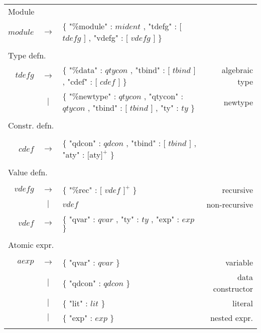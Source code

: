 \begin{scriptsize}
\begin{longtable}{ r c l r }

\\[0.01in]
\multicolumn{4}{l}{Module}		\\
$module$	& $ \rightarrow $ 	& $\{$ "\%module" : $mident$ , "tdefg" : $[$ $tdefg$ $]$ , "vdefg" : $[$ $vdefg$ $]$ $\}$			&			\\
\\[0.01in]

\multicolumn{4}{l}{Type defn.}		\\
$tdefg$ 	& $ \rightarrow $	& $\{$ "\%data" : $qtycon$ , "tbind" : $[$ $tbind$ $]$, "cdef" : $[$ $cdef$ $]$ $\}$							& algebraic type	\\
		& $ | $			& $\{$ "\%newtype" : $qtycon$ , "qtycon" : $qtycon$ , "tbind" : $[$ $tbind$ $]$ , "ty" : $ty$ $\}$ 		& newtype		\\
\\[0.01in]

\multicolumn{4}{l}{Constr. defn.}	\\
\\[0.01in]
$cdef$		& $ \rightarrow $	& $\{$ "qdcon" : $qdcon$ , "tbind" : $[$ $tbind$ $ ]$ , "aty" : $[$aty$]^{+}$ $\}$ 				& 			\\
\\[0.01in]

\multicolumn{4}{l}{Value defn.}		\\
\\[0.01in]
$vdefg$		& $ \rightarrow $	& $\{$ "\%rec" : $[$ $vdef$ $]^{+}$ $\}$    									& recursive		\\
		& $ | $			& $vdef$													& non-recursive		\\
$vdef$ 		& $ \rightarrow $	& $\{$ "qvar" : $qvar$ , "ty" : $ty$ , "exp" : $exp$ $\}$ 							& 			\\
\\[0.01in]

\multicolumn{4}{l}{Atomic expr.}	\\
\\[0.01in]
$aexp$		& $ \rightarrow $	& $\{$ "qvar" : $qvar$ $\}$											& variable		\\
		& $ | $			& $\{$ "qdcon" : $qdcon$ $\}$											& data constructor	\\
		& $ | $			& $\{$ "lit" : $lit$ $\}$											& literal		\\
		& $ | $			& $\{$ "exp" : $exp$ $\}$ 											& nested expr.		\\
\\[0.01in]


\end{longtable}
\end{scriptsize}
